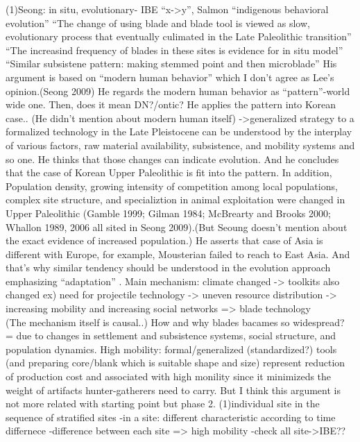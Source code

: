\documentclass[american,man]{apa6}
\begin{document}
(1)Seong: in situ, evolutionary- IBE \enquote{x-\textgreater{}y}, Salmon
\enquote{indigenous behavioral evolution} \enquote{The change of using
blade and blade tool is viewed as slow, evolutionary process that
eventually culimated in the Late Paleolithic transition}\\ \enquote{The
increasind frequency of blades in these sites is evidence for in situ
model} \enquote{Similar subsistene pattern: making stemmed point and
then microblade} His argument is based on \enquote{modern human
behavior} which I don't agree as Lee's opinion.(Seong 2009) He regards
the modern human behavior as \enquote{pattern}-world wide one. Then,
does it mean DN?/ontic? He applies the pattern into Korean case.. (He
didn't mention about modern human itself) -\textgreater{}generalized
strategy to a formalized technology in the Late Pleistocene can be
understood by the interplay of various factors, raw material
availability, subsistence, and mobility systems and so one. He thinks
that those changes can indicate evolution. And he concludes that the
case of Korean Upper Paleolithic is fit into the pattern. In addition,
Population density, growing intensity of competition among local
populations, complex site structure, and specializtion in animal
exploitation were changed in Upper Paleolithic (Gamble 1999; Gilman
1984; McBrearty and Brooks 2000; Whallon 1989, 2006 all sited in Seong
2009).(But Seoung doesn't mention about the exact evidence of increased
population.) He asserts that case of Asia is different with Europe, for
example, Mousterian failed to reach to East Asia. And that's why similar
tendency should be understood in the evolution approach emphasizing
\enquote{adaptation} . Main mechanism: climate changed -\textgreater{}
toolkits also changed ex) need for projectile technology -\textgreater{}
uneven resource distribution -\textgreater{} increasing mobility and
increasing social networks =\textgreater{} blade technology\\ (The
mechanism itself is causal..) How and why blades bacames so widespread?
= due to changes in settlement and subsistence systems, social
structure, and population dynamics. High mobility: formal/generalized
(standardized?) tools (and preparing core/blank which is suitable shape
and size) represent reduction of production cost and associated with
high monility since it minimizeds the weight of artifacts
hunter-gatherers need to carry. But I think this argument is not more
related with starting point but phase 2. (1)individual site in the
sequence of stratified sites -in a site: different characteristic
according to time differnece -difference between each site
=\textgreater{} high mobility -check all site-\textgreater{}IBE??
\end{document}
